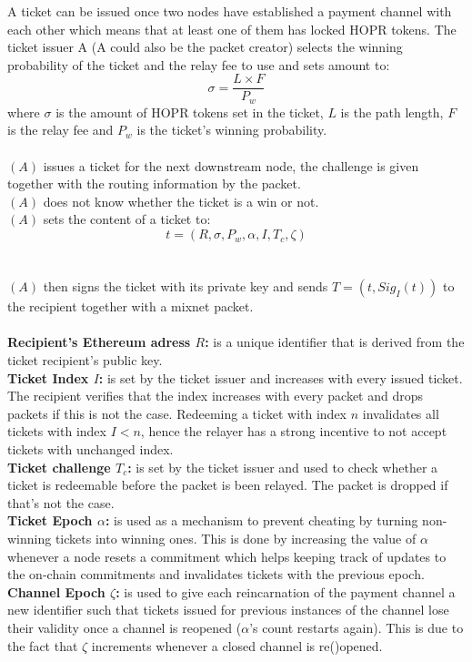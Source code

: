A ticket can be issued once two nodes have established a payment channel with each other which means that at least one of them has locked HOPR tokens.
\newline The ticket issuer A (A could also be the packet creator) selects the winning probability of the ticket and the relay fee to use and sets amount to:
$$\sigma=\dfrac{L\times F}{P_w}$$
where $\sigma$ is the amount of HOPR tokens set in the ticket, $L$ is the path length, $F$ is the relay fee and $P_w$ is the ticket's winning probability.
\\~\\$(A)$ issues a ticket for the next downstream node,
the challenge is given together with the routing information by the packet.
\\$(A)$ does not know whether the ticket is a win or not.
    \\$(A)$ sets the content of a ticket to: $$t=(R,\sigma,P_w,\alpha,I,T_c,\zeta)$$
\\~\\$(A)$ then signs the ticket with its private key and sends $T= (t, Sig_I(t))$ to the recipient together with a mixnet packet.
    \\~\\\textbf{Recipient's Ethereum adress $R$:} is a unique identifier that is derived from the ticket recipient's public key.
    \\\textbf{Ticket Index $I$:} is set by the ticket issuer and increases with every issued ticket. The recipient verifies that the index increases with every packet and drops packets if this is not the case. Redeeming a ticket with index $n$ invalidates all tickets with index $I<n$, hence the relayer has a strong incentive to not accept tickets with unchanged index.
    \\\textbf{Ticket challenge $T_c$:}  is set by the ticket issuer and used to check whether a ticket is redeemable before the packet is been relayed. The packet is dropped if that's not the case.
    \\\textbf{Ticket Epoch $\alpha$:} is used as a mechanism to prevent cheating by turning non-winning tickets into winning ones. This is done by increasing the value of $\alpha$ whenever a node resets a commitment which helps keeping track of updates to the on-chain commitments and invalidates tickets with the previous epoch.
    \\\textbf{Channel Epoch $\zeta$:} is used to give each reincarnation of the payment channel a new identifier such that tickets issued for previous instances of the channel lose their validity once a channel is reopened ($\alpha$'s count restarts again). This is due to the fact that $\zeta$ increments whenever a closed channel is re()opened.
